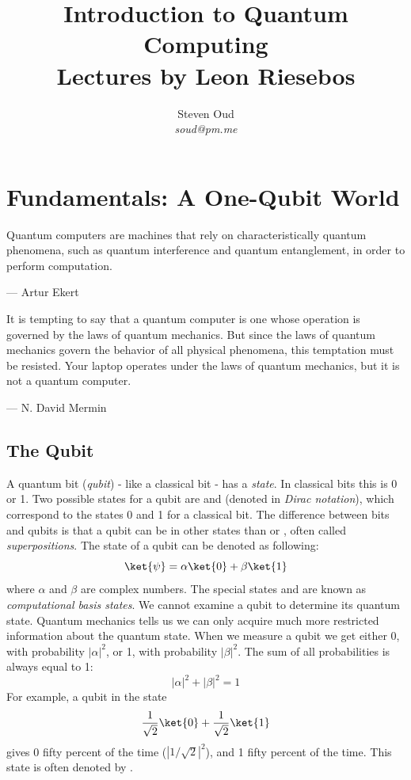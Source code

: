 \documentclass[11pt, notitlepage]{report}
\title{\textbf{Introduction to Quantum Computing \\
\large Lectures by Leon Riesebos}}
\author{Steven Oud \\ \emph{soud@pm.me}}
\makeatletter
\newcommand*{\toccontents}{\@starttoc{toc}}
\makeatother
\begin{document}
     
\maketitle

\toccontents

\newpage

\chapter{Fundamentals: A One-Qubit World}
\epigraph{Quantum computers are machines that rely on characteristically quantum phenomena, such as quantum interference and quantum entanglement, in order to perform computation.}{--- Artur Ekert}

\epigraph{It is tempting to say that a quantum computer is one whose operation is governed by the laws of quantum mechanics. But since the laws of quantum mechanics govern the behavior of all physical phenomena, this temptation must be resisted. Your laptop operates under the laws of quantum mechanics, but it is not a quantum computer.}{--- N. David Mermin}

\section{The Qubit}
A quantum bit (\emph{qubit}) - like a classical bit - has a \emph{state}. In classical bits this is 0 or 1. Two possible states for a qubit are  and  (denoted in \emph{Dirac notation}), which correspond to the states 0 and 1 for a classical bit. The difference between bits and qubits is that a qubit can be in other states than  or , often called \emph{superpositions}. The state of a qubit can be denoted as following:
\[\ket{\psi} = \alpha\ket{0} + \beta\ket{1}\]
where $\alpha$ and $\beta$ are complex numbers. The special states  and  are known as \emph{computational basis states}. We cannot examine a qubit to determine its quantum state. Quantum mechanics tells us we can only acquire much more restricted information about the quantum state. When we measure a qubit we get either 0, with probability $|\alpha|^2$, or 1, with probability $|\beta|^2$. The sum of all probabilities is always equal to 1:
\[|\alpha|^2 + |\beta|^2 = 1\]
For example, a qubit in the state
\[
\dfrac{1}{\sqrt2}\ket{0}+\dfrac{1}{\sqrt2}\ket{1}
\]
gives 0 fifty percent of the time ($|1/\sqrt2|^2$), and 1 fifty percent of the time. This state is often denoted by \ket{+}.
\end{document}
